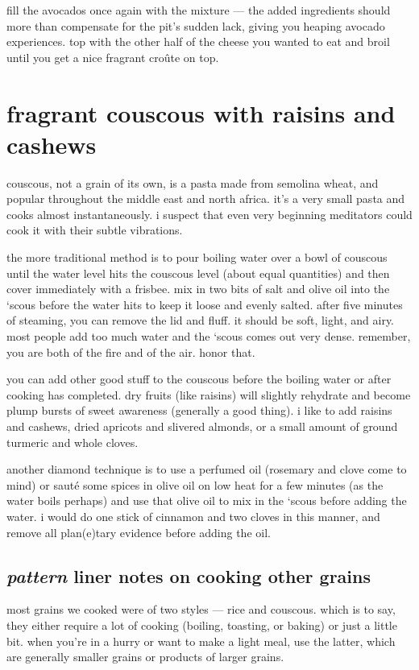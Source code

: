 fill the avocados once again with the mixture --- the added ingredients should 
more than compensate for the pit's sudden lack, giving you heaping avocado 
experiences. top with the other half of the cheese you wanted to eat and broil 
until you get a nice fragrant cro\^{u}te on top.
	
\section{fragrant couscous with raisins and cashews}

couscous, not a grain of its own, is a pasta made from semolina wheat, and 
popular throughout the middle east and north africa. it's a very small pasta 
and cooks almost instantaneously. i suspect that even very beginning 
meditators could cook it with their subtle vibrations.

the more traditional method is to pour boiling water over a bowl of couscous 
until the water level hits the couscous level (about equal quantities) and 
then cover immediately with a frisbee. mix in two bits of salt and olive oil 
into the `scous before the water hits to keep it loose and evenly salted. 
after five minutes of steaming, you can remove the lid and fluff. it should be 
soft, light, and airy. most people add too much water and the `scous comes out 
very dense. remember, you are both of the fire and of the air. honor that.

you can add other good stuff to the couscous before the boiling water or after 
cooking has completed. dry fruits (like raisins) will slightly rehydrate and 
become plump bursts of sweet awareness (generally a good thing). i like to add 
raisins and cashews, dried apricots and slivered almonds, or a small amount of 
ground turmeric and whole cloves. 

another diamond technique is to use a perfumed oil (rosemary and clove come to 
mind) or saut\'{e} some spices in olive oil on low heat for a few minutes (as 
the water boils perhaps) and use that olive oil to mix in the `scous before 
adding the water. i would do one stick of cinnamon and two cloves in this 
manner, and remove all plan(e)tary evidence before adding the oil.

\subsection{\textit{pattern} liner notes on cooking other grains}

most grains we cooked were of two styles --- rice and couscous. which is to 
say, they either require a lot of cooking (boiling, toasting, or baking) or 
just a little bit. when you're in a hurry or want to make a light meal, use 
the latter, which are generally smaller grains or products of larger grains.

